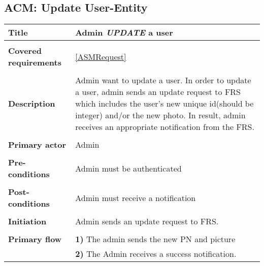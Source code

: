 \documentclass[a4paper,11pt]{article}
\begin{document}
\subsection{ACM: Update User-Entity}

\begin{tabular}{|p{3.5cm}|p{11.5cm}|} \hline 
    \textbf{Title} &   Admin \emph{UPDATE} a user 
   
    \\ \hline \rowcolor{Gray} & \\ \hline 
    
    \textbf{Covered requirements} &  \ref{ASMRequest}   
    
    \\ \hline \rowcolor{Gray} & \\ \hline 
   
    \textbf{Description} &  Admin want to update a user. In order to update a user, admin sends an update request to FRS which includes the user's new unique id(should be integer) and/or the new photo. In result, admin receives an appropriate notification from the FRS. 
   
    \\ \hline \rowcolor{Gray} & \\ \hline 
   
    \textbf{Primary actor} & Admin   
   
    \\ \hline \rowcolor{Gray} & \\ \hline  
   
    \textbf{Pre-conditions} &   Admin must be authenticated 
   
    \\ \hline \rowcolor{Gray} & \\ \hline 
   
    \textbf{Post-conditions} &   Admin must receive a notification 
   
    \\ \hline \rowcolor{Gray} & \\ \hline  
   
    \textbf{Initiation} & Admin sends an update request to FRS. 
   
    \\ \hline \rowcolor{Gray} & \\ \hline  
   
    \textbf{Primary flow} &  
    \textbf{1)} The admin sends the new PN and picture \\& 
    \textbf{2)} The Admin receives a success notification. 
   

\end{tabular}
\end{document}
